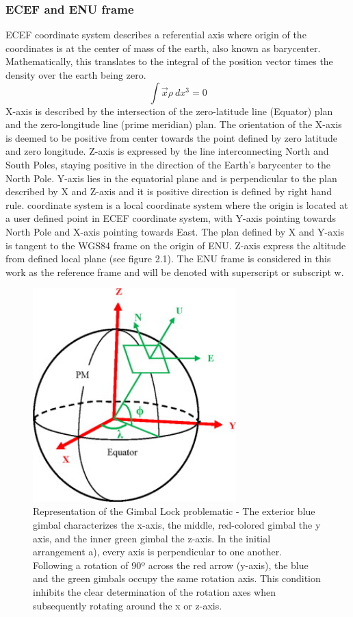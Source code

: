 \subsubsection{ECEF and ENU frame}
ECEF coordinate system describes a referential axis where origin of the coordinates is at the center of mass of the earth, also known as barycenter. Mathematically, this translates to the integral of the position vector times the density over the earth being zero.
\begin{equation}
    \int \overrightarrow{x}\rho~dx^3 = 0
\end{equation}
X-axis is described by the intersection of the zero-latitude line (Equator) plan and the zero-longitude line (prime meridian) plan. The orientation of the X-axis is deemed to be positive from center towards the point defined by zero latitude and zero longitude. Z-axis is expressed by the line interconnecting North and South Poles, staying positive in the direction of the Earth’s barycenter to the North Pole. Y-axis lies in the equatorial plane and is perpendicular to the plan described by X and Z-axis and it is positive direction is defined by right hand rule.
coordinate system is a local coordinate system where the origin is located at a user defined
point in ECEF coordinate system, with Y-axis pointing towards North Pole and X-axis pointing towards
East. The plan defined by X and Y-axis is tangent to the WGS84 frame on the origin of ENU. Z-axis
express the altitude from defined local plane (see figure 2.1). The ENU frame is considered in this work
as the reference frame and will be denoted with superscript or subscript w.
\begin{figure}[!h]
    \centering
    \includegraphics[width=0.7\textwidth]{figures/ECEF.jpg}
    \caption{Representation of the Gimbal Lock problematic \cite{zeitlhofler2019nominal} - The exterior blue gimbal characterizes the x-axis, the middle, red-colored gimbal the y axis, and the inner green gimbal the z-axis. In the initial arrangement a), every axis is perpendicular to one another. Following a rotation of 90º across the red arrow (y-axis), the blue and the green gimbals occupy the same rotation axis. This condition inhibits the clear determination of the rotation axes when subsequently rotating around the x or z-axis. }
    \label{fig:gimballock}
\end{figure}
